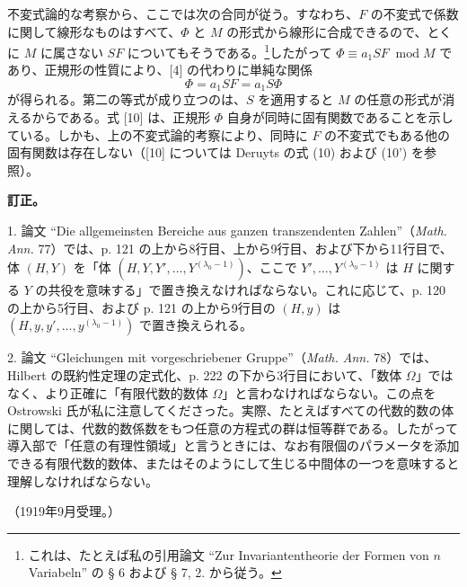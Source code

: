 \documentclass[11pt]{article}
\newcommand{\modu}[1]{\;\operatorname{mod} #1}
\begin{document}
不変式論的な考察から、ここでは次の合同が従う。すなわち、\(F\) の不変式で係数に関して線形なものはすべて、\(\Phi\) と \(M\) の形式から線形に合成できるので、とくに \(M\) に属さない \(SF\) についてもそうである。\footnote{これは、たとえば私の引用論文 ``Zur Invariantentheorie der Formen von \(n\) Variabeln'' の § 6 および § 7, 2. から従う。}したがって \(\Phi\equiv a_1SF\modu{M}\) であり、正規形の性質により、[4] の代わりに単純な関係
\begin{equation}
        \Phi=a_1SF=a_1S\Phi
\tag{10}
\end{equation}
が得られる。第二の等式が成り立つのは、\(S\) を適用すると \(M\) の任意の形式が消えるからである。式 [10] は、正規形 \(\Phi\) 自身が同時に固有関数であることを示している。しかも、上の不変式論的考察により、同時に \(F\) の不変式でもある他の固有関数は存在しない（[10] については Deruyts の式 (10) および (10') を参照）。

\begin{center}
\textbf{訂正。}
\end{center}

1. 論文 ``Die allgemeinsten Bereiche aus ganzen transzendenten Zahlen''（\emph{Math. Ann.} 77）では、p. 121 の上から8行目、上から9行目、および下から11行目で、体 \((H,Y)\) を「体 \((H,Y,Y',\ldots,Y^{(\lambda_0-1)})\)、ここで \(Y',\ldots,Y^{(\lambda_0-1)}\) は \(H\) に関する \(Y\) の共役を意味する」で置き換えなければならない。これに応じて、p. 120 の上から5行目、および p. 121 の上から9行目の \((H,y)\) は \((H,y,y',\ldots,y^{(\lambda_0-1)})\) で置き換えられる。

2. 論文 ``Gleichungen mit vorgeschriebener Gruppe''（\emph{Math. Ann.} 78）では、Hilbert の既約性定理の定式化、p. 222 の下から3行目において、「数体 \(\Omega\)」ではなく、より正確に「有限代数的数体 \(\Omega\)」と言わなければならない。この点を Ostrowski 氏が私に注意してくださった。実際、たとえばすべての代数的数の体に関しては、代数的数係数をもつ任意の方程式の群は恒等群である。したがって導入部で「任意の有理性領域」と言うときには、なお有限個のパラメータを添加できる有限代数的数体、またはそのようにして生じる中間体の一つを意味すると理解しなければならない。

\begin{center}
（1919年9月受理。）
\end{center}
\end{document}
